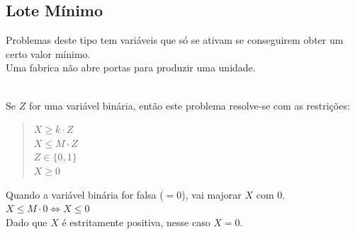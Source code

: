 \documentclass[]{report}
\begin{document}
\subsection{Lote Mínimo}
Problemas deste tipo tem variáveis que só se ativam se conseguirem obter um certo valor mínimo.\\
Uma fabrica não abre portas para produzir uma unidade.\\
\\
Se $Z$ for uma variável binária, então este problema resolve-se com as restrições:
\begin{quotation}
\noindent $X \geq k \cdot Z$\\
$X \leq M \cdot Z$\\
$Z \in \{0,1\}$\\
$X \geq 0$
\end{quotation}
Quando a variável binária for falsa ($=0$), vai majorar $X$ com $0$.\\
$X \leq M \cdot 0 \Leftrightarrow X \leq 0$\\
Dado que $X$ é estritamente positiva, nesse caso $X=0$.
\end{document}

